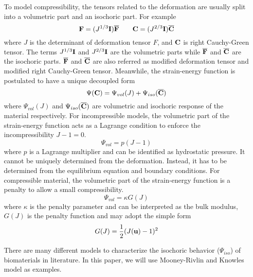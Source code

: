 To model compressibility, the tensors related to the deformation are usually split into a volumetric part and an isochoric part. For example
\begin{equation} \label{split1}
\bold{F} = (J^{1/3}\bold{I})\overline{\bold{F}}
\qquad
\bold{C} = (J^{2/3}\bold{I})\overline{\bold{C}}
\end{equation}
where $J$ is the determinant of deformation tensor $F$, and $\bold{C}$ is right Cauchy-Green tensor. The terms $J^{1/3}\bold{I}$ and $J^{2/3}\bold{I}$ are the volumetric parts while $\overline{\bold{F}}$ and $\overline{\bold{C}}$ are the isochoric parts. $\overline{\bold{F}}$ and $\overline{\bold{C}}$ are also referred as modified deformation tensor and modified right Cauchy-Green tensor. Meanwhile, the strain-energy function is postulated to have a unique decoupled form
\begin{equation} \label{split2}
\Psi(\bold{C}) = \Psi_{vol}(J) + \Psi_{iso}(\overline{\bold{C}})
\end{equation}
where $\Psi_{vol}(J)$ and $\Psi_{iso}(\overline{\bold{C}})$ are volumetric and isochoric response of the material respectively. For incompressible models, the volumetric part of the strain-energy function acts as a Lagrange condition to enforce the incompressibility $J -1 = 0$.
\begin{equation} \label{Lagrange}
\Psi_{vol} = p(J-1)
\end{equation} 
where $p$ is a Lagrange multiplier and can be identified as hydrostatic pressure. It cannot be uniquely determined from the deformation. Instead, it has to be determined from the equilibrium equation and boundary conditions. For compressible material, the volumetric part of the strain-energy function is a penalty to allow a small compressibility.
\begin{equation} \label{penalty}
\Psi_{vol} = \kappa{G(J)}
\end{equation}
where $\kappa$ is the penalty parameter and can be interpreted as the bulk modulus, $G(J)$ is the penalty function and may adopt the simple form
\begin{equation} \label{penalty2}
G(J) = \frac{1}{2}(J(\bold{u}) - 1 )^2
\end{equation}

There are many different models to characterize the isochoric behavior ($\Psi_{iso}$) of biomaterials in literature.  In this paper, we will use Mooney-Rivlin and Knowles model as examples.

%
